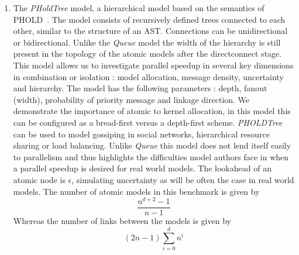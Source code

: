 \begin{enumerate}
	\item The \textit{PHoldTree} model, a hierarchical model based on the semantics of PHOLD~\cite{PHOLD}. The model consists of recursively defined trees connected to each other, similar to the structure of an AST. Connections can be unidirectional or bidirectional.
	Unlike the \textit{Queue} model the width of the hierarchy is still present in the topology of the atomic models after the directconnect stage. This model allows us to investigate parallel speedup in several key dimensions in combination or isolation : model allocation, message density, uncertainty and hierarchy. The model has the following parameters : depth, fanout (width), probability of priority message and linkage direction. We demonstrate the importance of atomic to kernel allocation, in this model this can be configured as a bread-first versus a depth-first scheme.
	\textit{PHOLDTree} can be used to model gossiping in social networks, hierarchical resource sharing or load balancing. Unlike \textit{Queue} this model does not lend itself easily to parallelism and thus highlights the difficulties model authors face in when a parallel speedup is desired for real world models.
	The lookahead of an atomic node is $\epsilon$, simulating uncertainty as will be often the case in real world models.
	The number of atomic models in this benchmark is given by 
	\begin{equation} \label{eq:pholdtreemodelcount}
	\frac{n^{d+2}-1}{n-1}
	\end{equation}
	Whereas the number of links between the models is given by
	\begin{equation} \label{eq:pholdtreelinkcount}
	(2n-1)\sum_{i=0}^{d}{n^i}
	\end{equation}
\end{enumerate}

